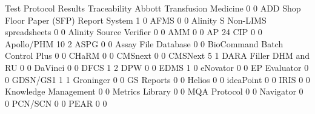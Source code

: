 \documentclass{article}
\begin{document}
\begin{Schunk}
\begin{Soutput}
                                           Test Protocol Results Traceability
  Abbott Transfusion Medicine                                  0            0
  ADD Shop Floor Paper (SFP) Report System                     1            0
  AFMS                                                         0            0
  Alinity S Non-LIMS spreadsheets                              0            0
  Alinity Source Verifier                                      0            0
  AMM                                                          0            0
  AP 24 CIP                                                    0            0
  Apollo/PHM                                                  10            2
  ASPG                                                         0            0
  Assay File Database                                          0            0
  BioCommand Batch Control Plus                                0            0
  CHaRM                                                        0            0
  CMSnext                                                      0            0
  CMSNext                                                      5            1
  DARA Filler DHM and RU                                       0            0
  DaVinci                                                      0            0
  DFCS                                                         1            2
  DPW                                                          0            0
  EDMS                                                         1            0
  eNovator                                                     0            0
  EP Evaluator                                                 0            0
  GDSN/GS1                                                     1            1
  Groninger                                                    0            0
  GS Reports                                                   0            0
  Helios                                                       0            0
  ideaPoint                                                    0            0
  IRIS                                                         0            0
  Knowledge Management                                         0            0
  Metrics Library                                              0            0
  MQA Protocol                                                 0            0
  Navigator                                                    0            0
  PCN/SCN                                                      0            0
  PEAR                                                         0            0

\end{Soutput}
\end{Schunk}
\end{document}
